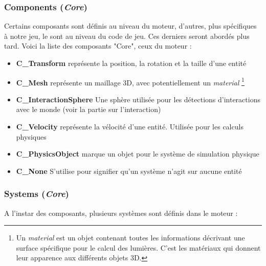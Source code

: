 \subsubsection{Components (\textit{Core})}
    Certains composants sont définis au niveau du moteur, d'autres, plus spécifiques à notre jeu, le sont au niveau du code de jeu. Ces derniers seront abordés plus tard. Voici la liste des composants "Core", ceux du moteur :
    \begin{itemize}
        \item \textbf{C\_Transform} représente la position, la rotation et la taille d'une entité
        \item \textbf{C\_Mesh} représente un maillage 3D, avec potentiellement un \textit{material}
        \footnote{Un \textit{material} est un objet contenant toutes les informations décrivant une surface spécifique pour le calcul des lumières. C'est les matériaux qui donnent leur apparence aux différents objets 3D.}
        \item \textbf{C\_InteractionSphere} Une sphère utilisée pour les détections d'interactions avec le monde (voir la partie sur l'interaction)
        \item \textbf{C\_Velocity} représente la vélocité d'une entité. Utilisée pour les calculs physiques
        \item \textbf{C\_PhysicsObject} marque un objet pour le système de simulation physique
        \item \textbf{C\_None} S'utilise pour signifier qu'un système n'agit sur aucune entité
    \end{itemize}



\subsubsection{Systems (\textit{Core})}
    A l'instar des composants, plusieurs systèmes sont définis dans le moteur :
    
